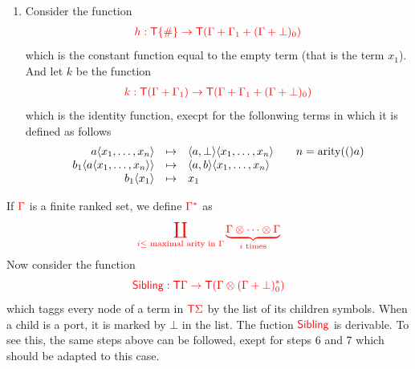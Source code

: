 \begin{example}
\begin{enumerate}
\begin{center}
		\end{center}
\item Consider the function 
\begin{align*}
{\color{red}{h: {\color{red}{\mathsf T}}\{\#\} \to {\color{red}{\mathsf T}}(\Gamma+\Gamma_1+(\Gamma+\bot)_0)}}
\end{align*}
which is the constant function equal to the empty term (that is the term $x_1$).
And let $k$ be the function
\begin{align*}
{\color{red}{k: {\color{red}{\mathsf T}}(\Gamma+\Gamma_1) \to {\color{red}{\mathsf T}}(\Gamma+\Gamma_1+(\Gamma+\bot)_0)}}
\end{align*}
which is the identity function, execpt for the follonwing terms in which it is defined as follows
$$\begin{array}{rll}
a\langle{x_1,\dots, x_n}\rangle& \mapsto & \langle{a,\bot}\rangle\langle{x_1,\dots,x_n}\rangle\qquad n=\mathrm{arity}(()a)\\
b_1\langle{a\langle{x_1,\dots,x_n}\rangle}\rangle&\mapsto& \langle{a,b}\rangle\langle{x_1,\dots,x_n}\rangle\\
b_1\langle{x_1}\rangle &\mapsto& x_1
\end{array}$$
\end{enumerate}
	

\medskip
If ${\color{red}{\Gamma}}$ is a finite ranked set, we define ${\color{red}{\Gamma^*}}$ as
$${\color{red}{\coprod_{i \leq \text{ maximal arity in } {\color{red}{\Gamma}}} \underbrace{{\color{red}{\Gamma}}\otimes \cdots \otimes {\color{red}{\Gamma}}}_{i\text{ times}}}}$$
Now consider the function $${\color{red}{\mathsf{Sibling}:{\color{red}{\mathsf T}}{\color{red}{\Gamma}}\to {\color{red}{\mathsf T}}({\color{red}{\Gamma}}\otimes ({\color{red}{\Gamma}}+\bot)^*_0)}}$$ which taggs every node of a term in ${\color{red}{\mathsf T}} {\color{red}{\Sigma}}$ by the list  of its children symbols. When a child is a port, it is marked by $\bot$ in the list.
The fuction ${\color{red}{\mathsf{Sibling}}}$ is derivable. To see this, the same steps above can be followed, exept for steps 6 and 7 which should be adapted to this case. 
\end{example}



